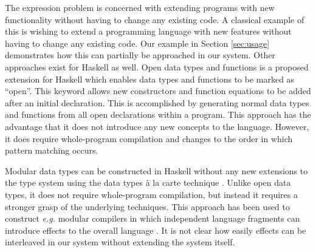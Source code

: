 The expression problem \cite{wadler1998expression} is concerned with extending programs with new functionality without having to change any existing code. A classical example of this is wishing to extend a programming language with new features without having to change any existing code. Our example in Section \ref{sec:usage} demonstrates how this can partially be approached in our system. Other approaches exist for Haskell as well. Open data types and functions \cite{loh2006open} is a proposed extension for Haskell which enables data types and functions to be marked as ``open''. This keyword allows new constructors and function equations to be added after an initial declaration. This is accomplished by generating normal data types and functions from all open declarations within a program. This approach has the advantage that it does not introduce any new concepts to the language. However, it does require whole-program compilation and changes to the order in which pattern matching occurs.

Modular data types can be constructed in Haskell without any new extensions to the type system using the data types \`a la carte technique \cite{swierstra2008data}. Unlike open data types, it does not require whole-program compilation, but instead it requires a stronger grasp of the underlying techniques. This approach has been used to construct \emph{e.g.} modular compilers in which independent language fragments can introduce effects to the overall language \cite{day2012towards}. It is not clear how easily effects can be interleaved in our system without extending the system itself.


